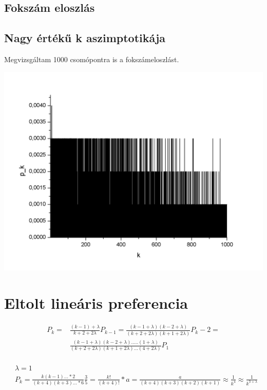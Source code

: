 \documentclass[paper=a4, fontsize=11pt]{article}
\begin{document}
\subsection{Fokszám eloszlás}


\subsection{Nagy értékű k aszimptotikája}
Megvizsgáltam 1000 csomópontra is a fokszámeloszlást.

\includegraphics[width=\textwidth]{antipk1000}



\newpage

\section{Eltolt lineáris preferencia}



\begin{align}
P_k=&\frac{(k-1)+\lambda}{k+2+2\lambda}P_{k-1}=\frac{(k-1+\lambda)(k-2+\lambda)}{(k+2+2\lambda)(k+1+2\lambda)}P_k-2=\\
&\frac{(k-1+\lambda)(k-2+\lambda).....(1+\lambda)}{(k+2+2\lambda)(k+1+2\lambda)...(4+2\lambda)}P_1\\
\end{align}

\begin{align}
&\lambda=1\\
&P_k=\frac{k(k-1)...*2}{(k+4)(k+3)...*6}\frac{3}{5}=\frac{k!}{(k+4)!}*a=\frac{a}{(k+4)(k+3)(k+2)(k+1)}\approx \frac{1}{k^4} \approx \frac{1}{k^{3+\lambda}}
\end{align}
\end{document}
